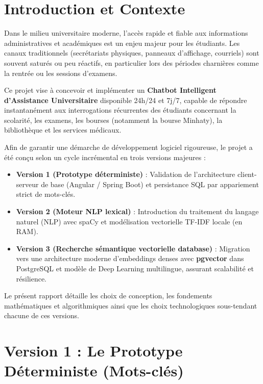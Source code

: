 \documentclass[11pt,a4paper]{article}
\begin{document}
\tableofcontents
\clearpage

\section[Introduction]{Introduction et Contexte}

Dans le milieu universitaire moderne, l'accès rapide et fiable aux informations administratives et académiques est un enjeu majeur pour les étudiants. Les canaux traditionnels (secrétariats physiques, panneaux d'affichage, courriels) sont souvent saturés ou peu réactifs, en particulier lors des périodes charnières comme la rentrée ou les sessions d'examens.

Ce projet vise à concevoir et implémenter un \textbf{Chatbot Intelligent d'Assistance Universitaire} disponible 24h/24 et 7j/7, capable de répondre instantanément aux interrogations récurrentes des étudiants concernant la scolarité, les examens, les bourses (notamment la bourse Minhaty), la bibliothèque et les services médicaux.

Afin de garantir une démarche de développement logiciel rigoureuse, le projet a été conçu selon un cycle incrémental en trois versions majeures :
\begin{itemize}
    \item \textbf{Version 1 (Prototype déterministe)} : Validation de l'architecture client-serveur de base (Angular / Spring Boot) et persistance SQL par appariement strict de mots-clés.
    \item \textbf{Version 2 (Moteur NLP lexical)} : Introduction du traitement du langage naturel (NLP) avec spaCy et modélisation vectorielle TF-IDF locale (en RAM).
    \item \textbf{Version 3 (Recherche sémantique vectorielle database)} : Migration vers une architecture moderne d'embeddings denses avec \textbf{pgvector} dans PostgreSQL et modèle de Deep Learning multilingue, assurant scalabilité et résilience.
\end{itemize}

Le présent rapport détaille les choix de conception, les fondements mathématiques et algorithmiques ainsi que les choix technologiques sous-tendant chacune de ces versions.

\clearpage

\section[V1 : Prototype Mots-clés]{Version 1 : Le Prototype Déterministe (Mots-clés)}
\end{document}
